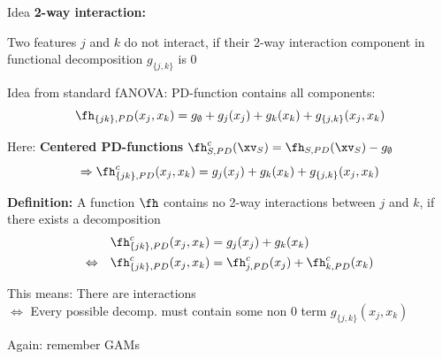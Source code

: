 \documentclass[10pt,compress,t,notes=noshow, xcolor=table]{beamer}
\begin{document}


\begin{framev}[align=top]{Idea }
\textbf{2-way interaction:}
\begin{itemizeM}
\item<+-> Two features $j$ and $k$ do not interact, if their 2-way interaction component in functional decomposition $g_{\{j,k\}}$ is 0
\item<+-> Idea from standard fANOVA: PD-function contains all components:
$$
\fh_{\{jk\}, PD}(x_j, x_k)
= g_\emptyset + g_j(x_j) + g_k(x_k) + g_{\{j,k\}}(x_j, x_k)
$$
\item<+-> Here: \textbf{Centered PD-functions} $\fh_{S,PD}^c(\xv_S) = \fh_{S,PD}(\xv_S) - g_\emptyset$
$$
\Rightarrow \fh^c_{\{jk\}, PD}(x_j, x_k)
= g_j(x_j) + g_k(x_k) + g_{\{j,k\}}(x_j, x_k)
$$
\item<+-> \textbf{Definition:} A function $\fh$ contains no 2-way interactions between $j$ and $k$, if there exists a decomposition
\begin{align*}
& \fh_{\{jk\}, PD}^c(x_j, x_k)
= g_j(x_j) + g_k(x_k) \\
\Leftrightarrow \quad
& \fh_{\{jk\}, PD}^c(x_j, x_k)
= \fh^c_{j, PD}(x_j) + \fh^c_{k, PD}(x_k)
\end{align*}
\item<+-> This means: There are interactions \\
$\Leftrightarrow$ Every possible decomp. must contain some non 0 term $g_{\{j,k\}}(x_j, x_k)$
\item<+-> Again: remember GAMs
\end{itemizeM}
\end{framev}
\end{document}

